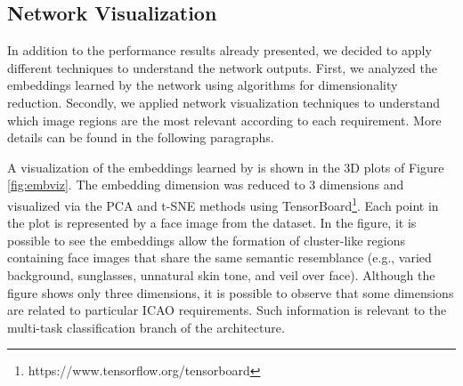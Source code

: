 \subsection{Network Visualization} \label{sec:netviz}

In addition to the performance results already presented, we decided to apply different techniques to understand the network outputs. First, we analyzed the embeddings learned by the network using algorithms for dimensionality reduction. Secondly, we applied network visualization techniques to understand which image regions are the most relevant according to each requirement. More details can be found in the following paragraphs.

A visualization of the embeddings learned by \methodname is shown in the 3D plots of Figure \ref{fig:embviz}. The embedding dimension was reduced to 3 dimensions and visualized via the PCA \citep{pca} and t-SNE \citep{tsne} methods using TensorBoard\footnote{https://www.tensorflow.org/tensorboard}. Each point in the plot is represented by a face image from the dataset. In the figure, it is possible to see the embeddings allow the formation of cluster-like regions containing face images that share the same semantic resemblance (e.g., varied background, sunglasses, unnatural skin tone, and veil over face). Although the figure shows only three dimensions, it is possible to observe that some dimensions are related to particular ICAO requirements. Such information is relevant to the multi-task classification branch of the \methodname architecture. 

